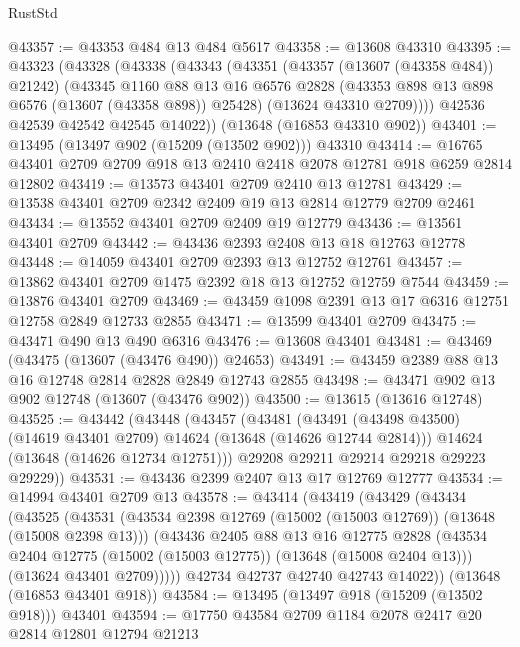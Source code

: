 \begin{lexlean}{RustStd}
\begin{coremodule}
@43357 := @43353 @484 @13 @484 @5617
@43358 := @13608 @43310
@43395 := @43323
    (@43328
      (@43338
        (@43343
          (@43351
            (@43357 (@13607 (@43358 @484)) @21242)
            (@43345
              @1160
              @88
              @13
              @16
              @6576
              @2828
              (@43353 @898 @13 @898 @6576 (@13607 (@43358 @898)) @25428)
              (@13624 @43310 @2709))))
        @42536
        @42539
        @42542
        @42545
        @14022))
    (@13648 (@16853 @43310 @902))
@43401 := @13495 (@13497 @902 (@15209 (@13502 @902))) @43310
@43414 := @16765 @43401 @2709 @2709 @918 @13 @2410 @2418 @2078 @12781 @918 @6259 @2814 @12802
@43419 := @13573 @43401 @2709 @2410 @13 @12781
@43429 := @13538 @43401 @2709 @2342 @2409 @19 @13 @2814 @12779 @2709 @2461
@43434 := @13552 @43401 @2709 @2409 @19 @12779
@43436 := @13561 @43401 @2709
@43442 := @43436 @2393 @2408 @13 @18 @12763 @12778
@43448 := @14059 @43401 @2709 @2393 @13 @12752 @12761
@43457 := @13862 @43401 @2709 @1475 @2392 @18 @13 @12752 @12759 @7544
@43459 := @13876 @43401 @2709
@43469 := @43459 @1098 @2391 @13 @17 @6316 @12751 @12758 @2849 @12733 @2855
@43471 := @13599 @43401 @2709
@43475 := @43471 @490 @13 @490 @6316
@43476 := @13608 @43401
@43481 := @43469 (@43475 (@13607 (@43476 @490)) @24653)
@43491 := @43459 @2389 @88 @13 @16 @12748 @2814 @2828 @2849 @12743 @2855
@43498 := @43471 @902 @13 @902 @12748 (@13607 (@43476 @902))
@43500 := @13615 (@13616 @12748)
@43525 := @43442
    (@43448
      (@43457
        (@43481
          (@43491 (@43498 @43500) (@14619 @43401 @2709) @14624 (@13648 (@14626 @12744 @2814)))
          @14624
          (@13648 (@14626 @12734 @12751)))
        @29208
        @29211
        @29214
        @29218
        @29223
        @29229))
@43531 := @43436 @2399 @2407 @13 @17 @12769 @12777
@43534 := @14994 @43401 @2709 @13
@43578 := @43414
    (@43419
      (@43429
        (@43434
          (@43525
            (@43531
              (@43534 @2398 @12769 (@15002 (@15003 @12769)) (@13648 (@15008 @2398 @13)))
              (@43436
                @2405
                @88
                @13
                @16
                @12775
                @2828
                (@43534 @2404 @12775 (@15002 (@15003 @12775)) (@13648 (@15008 @2404 @13)))
                (@13624 @43401 @2709)))))
        @42734
        @42737
        @42740
        @42743
        @14022))
    (@13648 (@16853 @43401 @918))
@43584 := @13495 (@13497 @918 (@15209 (@13502 @918))) @43401
@43594 := @17750 @43584 @2709 @1184 @2078 @2417 @20 @2814 @12801 @12794 @21213

\end{coremodule}
\end{lexlean}
